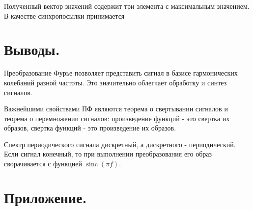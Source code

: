 \documentclass[a4paper,14pt]{extarticle}
\DeclareMathOperator{\sinc}{sinc}
\begin{document}
Полученный вектор значений содержит три элемента с максимальным значением. В качестве синхропосылки принимается  

\section{Выводы.}

Преобразование Фурье позволяет представить сигнал в базисе гармонических колебаний разной частоты. Это значительно облегчает обработку и синтез сигналов.

Важнейшими свойствами ПФ являются теорема о свертывании сигналов и теорема о перемножении сигналов: произведение функций - это свертка их образов, свертка функций - это произведение их образов.

Спектр периодического сигнала дискретный, а дискретного - периодический. Если сигнал конечный, то при выполнении преобразования его образ сворачивается с функцией $\sinc(\pi f)$. 

\section{Приложение.}


\end{document}
